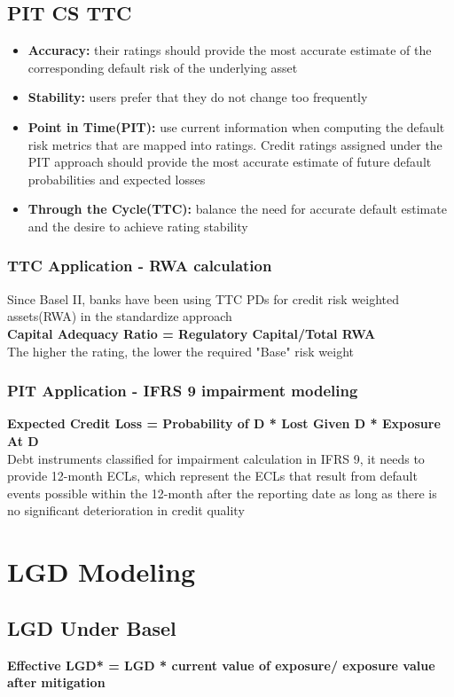 \documentclass{article}
\theoremstyle{definition}
\theoremstyle{thrm}
\theoremstyle{lma}
\theoremstyle{ppst}
\theoremstyle{crlr}
\begin{document}
\subsection{PIT CS TTC}
\begin{itemize}
	\item \textbf{Accuracy: } their ratings should provide the most accurate estimate of the corresponding default risk of the underlying asset
	\item \textbf{Stability: }users prefer that they do not change too frequently
	\item \textbf{Point in Time(PIT): } use current information when computing the default risk metrics that are mapped into ratings. Credit ratings assigned under the PIT approach should provide the most accurate estimate of future default probabilities and expected losses
	\item \textbf{Through the Cycle(TTC): } balance the need for accurate default estimate and the desire to achieve rating stability 
\end{itemize}
\subsubsection{TTC Application - RWA calculation}
Since Basel II, banks have been using TTC PDs for credit risk weighted assets(RWA) in the standardize approach\\
\textbf{Capital Adequacy Ratio = Regulatory Capital/Total RWA}\\
The higher the rating, the lower the required "Base" risk weight
\subsubsection{PIT Application - IFRS 9 impairment modeling}
\textbf{Expected Credit Loss = Probability of D * Lost Given D * Exposure At D}\\
Debt instruments classified for impairment calculation in IFRS 9, it needs to provide 12-month ECLs, which represent the ECLs that result from default events possible within the 12-month after the reporting date as long as there is no significant deterioration in credit quality

\section{LGD Modeling}
\subsection{LGD Under Basel}
\textbf{Effective LGD* = LGD * current value of exposure/ exposure value after mitigation}
\end{document}
